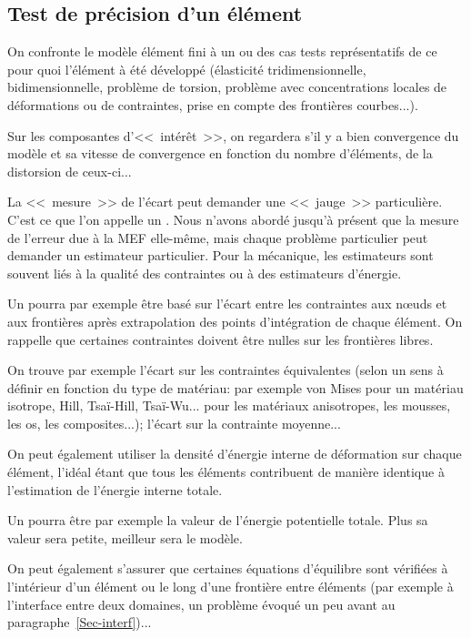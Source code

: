 \medskip
\subsection{Test de précision d'un élément}
On confronte le modèle élément fini à un ou des cas tests représentatifs de ce pour
quoi l'élément à été développé (élasticité tridimensionnelle,
bidimensionnelle, problème de torsion, problème avec concentrations locales de
déformations ou de contraintes, prise en compte des frontières courbes...).

Sur les composantes d'<<~intérêt~>>, on regardera s'il y a bien convergence
du modèle et sa vitesse de convergence en fonction du nombre d'éléments,
de la distorsion de ceux-ci...

\medskip
La <<~mesure~>> de l'écart peut demander une <<~jauge~>> particulière.
C'est ce que l'on appelle un .
Nous n'avons abordé jusqu'à présent que la mesure de l'erreur due à la
MEF elle-même, mais chaque problème particulier peut demander un
estimateur particulier.
Pour la mécanique, les estimateurs sont souvent liés à la qualité des
contraintes ou à des estimateurs d'énergie.

\medskip
Un  pourra par exemple être basé
sur l'écart entre les contraintes aux nœuds et aux frontières après
extrapolation des points d'intégration de chaque élément. On rappelle
que certaines contraintes doivent être nulles sur les frontières libres.

On trouve par exemple l'écart sur les contraintes équivalentes (selon un
sens à définir en fonction du type de matériau: par exemple von Mises
pour un matériau isotrope, Hill,
Tsaï-Hill,
Tsaï-Wu...
pour les matériaux anisotropes, les mousses, les os, les composites...);
l'écart sur la contrainte moyenne...

On peut également utiliser la densité d'énergie interne de
déformation sur chaque élément, l'idéal étant que tous les
éléments contribuent de manière identique à l'estimation de
l'énergie interne totale.

\medskip
Un  pourra être par exemple
la valeur de l'énergie potentielle totale. Plus sa valeur sera petite, meilleur
sera le modèle.

\medskip
On peut également s'assurer que certaines équations d'équilibre sont vérifiées
à l'intérieur d'un élément ou le long d'une frontière entre éléments (par
exemple à l'interface entre deux domaines, un problème évoqué un peu avant
au paragraphe~\ref{Sec-interf})...


\ifVersionAvecExemplesSepares\else
\fi
